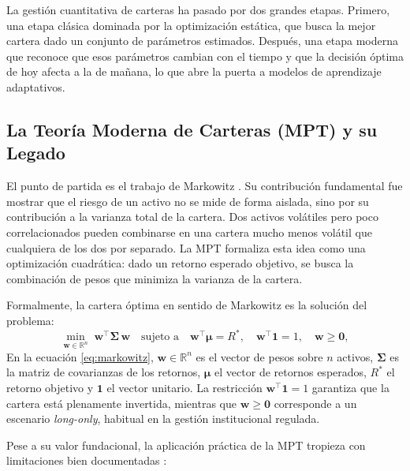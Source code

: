\documentclass[IB,a4paper]{TFUOC}
\begin{document}
La gestión cuantitativa de carteras ha pasado por dos grandes etapas. Primero, una etapa clásica dominada por la optimización estática, que busca la mejor cartera dado un conjunto de parámetros estimados. Después, una etapa moderna que reconoce que esos parámetros cambian con el tiempo y que la decisión óptima de hoy afecta a la de mañana, lo que abre la puerta a modelos de aprendizaje adaptativos.

\subsection{La Teoría Moderna de Carteras (MPT) y su Legado}
El punto de partida es el trabajo de Markowitz \citep{markowitz1952}. Su contribución fundamental fue mostrar que el riesgo de un activo no se mide de forma aislada, sino por su contribución a la varianza total de la cartera. Dos activos volátiles pero poco correlacionados pueden combinarse en una cartera mucho menos volátil que cualquiera de los dos por separado. La MPT formaliza esta idea como una optimización cuadrática: dado un retorno esperado objetivo, se busca la combinación de pesos que minimiza la varianza de la cartera.

Formalmente, la cartera óptima en sentido de Markowitz es la solución del problema:
\begin{equation}
\min_{\mathbf{w} \in \mathbb{R}^{n}} \; \mathbf{w}^{\top} \boldsymbol{\Sigma}\, \mathbf{w}
\quad \text{sujeto a} \quad
\mathbf{w}^{\top} \boldsymbol{\mu} = R^{*},
\quad \mathbf{w}^{\top} \mathbf{1} = 1,
\quad \mathbf{w} \geq \mathbf{0},
\label{eq:markowitz}
\end{equation}
En la ecuación \eqref{eq:markowitz}, $\mathbf{w} \in \mathbb{R}^{n}$ es el vector de pesos sobre $n$ activos, $\boldsymbol{\Sigma}$ es la matriz de covarianzas de los retornos, $\boldsymbol{\mu}$ el vector de retornos esperados, $R^{*}$ el retorno objetivo y $\mathbf{1}$ el vector unitario. La restricción $\mathbf{w}^{\top}\mathbf{1}=1$ garantiza que la cartera está plenamente invertida, mientras que $\mathbf{w}\geq\mathbf{0}$ corresponde a un escenario \textit{long-only}, habitual en la gestión institucional regulada.

Pese a su valor fundacional, la aplicación práctica de la MPT tropieza con limitaciones bien documentadas \citep{michaud1989}:
\end{document}
